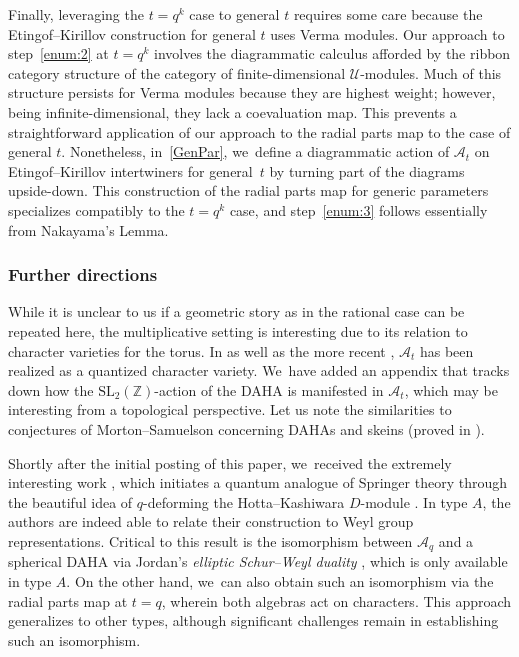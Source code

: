 \documentclass[JEP,XML,SOM,Unicode,published]{cedram}
\newcommand{\SL}{\mathrm{SL}}
\theoremstyle{definition}
\newcommand{\ZZ}{\mathbb{Z}}
\newcommand{\UU}{\mathcal{U}}
\newcommand{\AAA}{\mathcal{A}}
\begin{document}
Finally, leveraging the $t=q^k$ case to general $t$ requires some care because the Etingof--Kirillov construction for general $t$ uses Verma modules.
Our approach to step~\eqref{enum:2} at $t=q^k$ involves the diagrammatic calculus afforded by the ribbon category structure of the category of finite-dimensional $\UU$-modules.
Much of this structure persists for Verma modules because they are highest weight; however, being infinite-dimensional, they lack a coevaluation map.
This prevents a straightforward application of our approach to the radial parts map to the case of general $t$.
Nonetheless, in~\ref{GenPar}, we~define a diagrammatic action of $\mathcal{A}_t$ on Etingof--Kirillov intertwiners for general~$t$ by turning part of the diagrams upside-down.
This construction of the radial parts map for generic parameters specializes compatibly to the $t=q^k$ case, and step~\eqref{enum:3} follows essentially from Nakayama's Lemma.

\subsubsection*{Further directions}
While it is unclear to us if a geometric story as in the rational case can be repeated here, the multiplicative setting is interesting due to its relation to character varieties for the torus.
In \cite{AlekScho} as well as the more recent \cite{BBJ1,BBJ2}, $\AAA_t$ has been realized as a quantized character variety. We~have added an appendix that tracks down how the $\SL_2(\ZZ)$-action of the DAHA is manifested in $\AAA_t$, which may be interesting from a topological perspective.
Let us note the similarities to conjectures of Morton--Samuelson \cite{MortSamDAHA} concerning DAHAs and skeins (proved in \cite{BCMN}).

Shortly after the initial posting of this paper, we~received the extremely interesting work \cite{GJV}, which initiates a quantum analogue of Springer theory through the beautiful idea of $q$-deforming the Hotta--Kashiwara $D$-module \cite{HottKash}.
In type $A$, the authors are indeed able to relate their construction to Weyl group representations.
Critical to this result is the isomorphism between $\AAA_q$ and a spherical DAHA via Jordan's \textit{elliptic Schur--Weyl duality} \cite{JordanEll,JorVaz}, which is only available in type $A$.
On the other hand, we~can also obtain such an isomorphism via the radial parts map at $t=q$, wherein both algebras act on characters.
This approach generalizes to other types, although significant challenges remain in establishing such an isomorphism.
\end{document}
